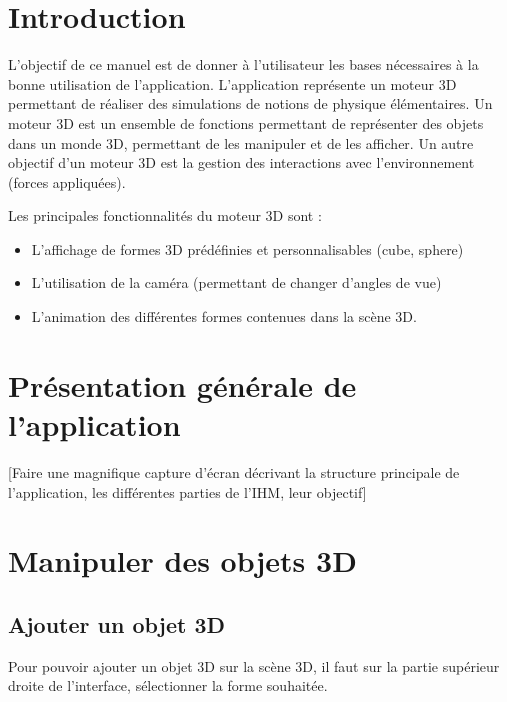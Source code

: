\documentclass[11pt]{report}
\begin{document}


\tableofcontents

\chapter{Introduction}
L'objectif de ce manuel est de donner à l'utilisateur les bases nécessaires à la bonne utilisation de l'application.
L'application représente un moteur 3D permettant de réaliser des simulations de notions de physique élémentaires.
Un moteur 3D est un ensemble de fonctions permettant de représenter des objets dans un monde 3D, permettant de les
manipuler et de les afficher. Un autre objectif d'un moteur 3D est la gestion des interactions avec l'environnement (forces appliquées). \newline \newline


Les principales fonctionnalités du moteur 3D sont :
\begin{itemize}
        \item L'affichage de formes 3D prédéfinies et personnalisables (cube, sphere)
        \item L'utilisation de la caméra (permettant de changer d'angles de vue)
        \item L'animation des différentes formes contenues dans la scène 3D.
\end{itemize}

\chapter{Présentation générale de l'application}
[Faire une magnifique capture d'écran décrivant la structure principale de l'application, les différentes parties de l'IHM, leur objectif]

\chapter{Manipuler des objets 3D}

\section{Ajouter un objet 3D}
Pour pouvoir ajouter un objet 3D sur la scène 3D, il faut sur la partie supérieur droite de l'interface, sélectionner la forme souhaitée.
\newline
\end{document}
